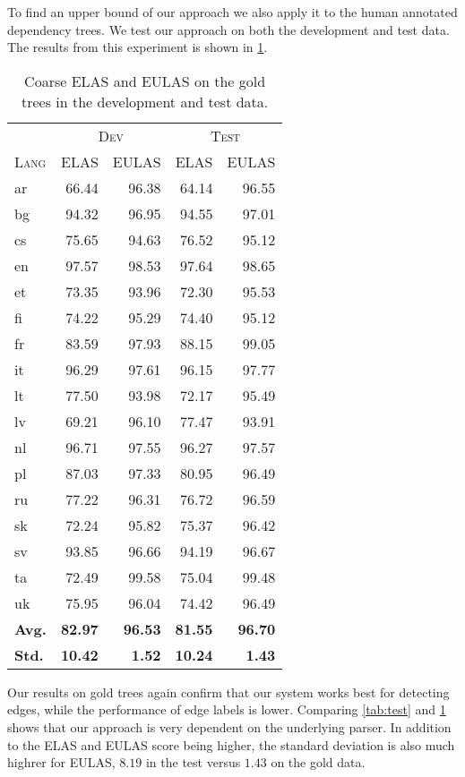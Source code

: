 \documentclass[11pt,a4paper]{article}
\begin{document}
To find an upper bound of our approach we also apply it to the
human annotated dependency trees. We test our approach on both
the development and test data. The results from this experiment
is shown in \cref{tab:gold-data}.
    
    
\begin{table}[ht]
	\centering
    \small
	\begin{tabular}{l|rrrr}
        & \multicolumn{2}{c}{\textsc{Dev}} & \multicolumn{2}{c}{\textsc{Test}} \\
		\textsc{Lang} & \textsc{ELAS} & \textsc{EULAS} & \textsc{ELAS} & \textsc{EULAS} \\
		\hline 
		ar & 66.44 & 96.38 & 64.14 & 96.55 \\
		bg & 94.32 & 96.95 & 94.55 & 97.01 \\
		cs & 75.65 & 94.63 & 76.52 & 95.12 \\
		en & 97.57 & 98.53 & 97.64 & 98.65 \\
		et & 73.35 & 93.96 & 72.30 & 95.53 \\
		fi & 74.22 & 95.29 & 74.40 & 95.12 \\
		fr & 83.59 & 97.93 & 88.15 & 99.05 \\
		it & 96.29 & 97.61 & 96.15 & 97.77 \\
		lt & 77.50 & 93.98 & 72.17 & 95.49 \\
		lv & 69.21 & 96.10 & 77.47 & 93.91 \\
		nl & 96.71 & 97.55 & 96.27 & 97.57 \\
		pl & 87.03 & 97.33 & 80.95 & 96.49 \\
		ru & 77.22 & 96.31 & 76.72 & 96.59 \\
		sk & 72.24 & 95.82 & 75.37 & 96.42 \\
		sv & 93.85 & 96.66 & 94.19 & 96.67 \\
		ta & 72.49 & 99.58 & 75.04 & 99.48 \\
		uk & 75.95 & 96.04 & 74.42 & 96.49 \\
		\textbf{Avg.} & \textbf{82.97}  & \textbf{96.53}& \textbf{81.55} & \textbf{96.70} \\
        \textbf{Std.} & \textbf{10.42} & \textbf{1.52} & \textbf{10.24} & \textbf{1.43} \\
	\end{tabular}
	\caption{\label{tab:gold-data}Coarse ELAS and EULAS on the gold trees in the development and test data.}
\end{table} 

Our results on gold trees again confirm that our system works best
for detecting edges, while the performance of edge labels is
lower. Comparing \cref{tab:test} and \cref{tab:gold-data} shows
that our approach is very dependent on the underlying parser. In
addition to the ELAS and EULAS score being higher, the standard
deviation is also much highrer for EULAS, $8.19$ in the test
versus $1.43$ on the gold data.
    
\end{document}
